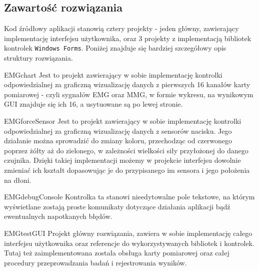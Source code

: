 \documentclass[10pt, a4paper]{article}
\begin{document}
\subsection{Zawartość rozwiązania}
Kod źródłowy aplikacji stanowią cztery projekty - jeden główny, zawierający implementację interfejsu użytkownika, oraz 3 projekty z implementacją bibliotek kontrolek \texttt{Windows Forms}. Poniżej znajduje się bardziej szczegółowy opis struktury rozwiązania.
\begin{subsubsection}{EMGchart}
Jest to projekt zawierający w sobie implementację kontrolki odpowiedzialnej za graficzną wizualizację danych z pierwszych 16 kanałów karty pomiarowej - czyli sygnałów EMG oraz MMG, w formie wykresu, na wynikowym GUI znajduje się ich 16, a usytuowane są po lewej stronie.
\end{subsubsection}
\begin{subsubsection}{EMGforceSensor}
Jest to projekt zawierający w sobie implementację kontrolki odpowiedzialnej za graficzną wizualizację danych z sensorów nacisku. Jego działanie można sprowadzić do zmiany koloru, przechodząc od czerwonego poprzez żółty aż do zielonego, w zależności wielkości siły przyłożonej do danego czujnika. Dzięki takiej implementacji możemy w projekcie interfejsu dowolnie zmieniać ich kształt dopasowując je do przypisanego im sensora i jego położenia na dłoni.
\end{subsubsection}
\begin{subsubsection}{EMGdebugConsole}
Kontrolka ta stanowi nieedytowalne pole tekstowe, na którym wyświetlane zostają proste komunikaty dotyczące działania aplikacji bądź ewentualnych napotkanych błędów.
\end{subsubsection}
\begin{subsubsection}{EMGtestGUI}
Projekt główny rozwiązania, zawiera w sobie implementację całego interfejsu użytkownika oraz referencje do wykorzystywanych bibliotek i kontrolek. Tutaj też zaimplementowana została obsługa karty pomiarowej oraz całej procedury przeprowadzania badań i rejestrowania wyników.
\end{subsubsection}
\end{document}
